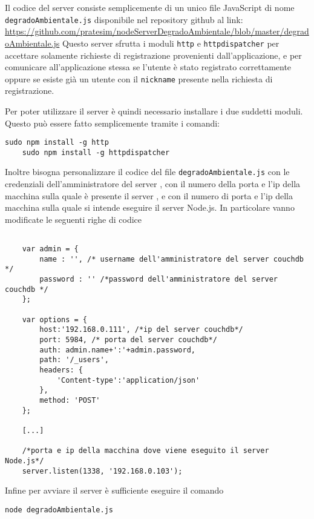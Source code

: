         Il codice del server consiste semplicemente di un unico file
        JavaScript di nome \texttt{degradoAmbientale.js} disponibile nel
        repository github al link:
        \url{https://github.com/pratesim/nodeServerDegradoAmbientale/blob/master/degradoAmbientale.js}
        Questo server sfrutta i moduli \texttt{http} e \texttt{httpdispatcher}
        per accettare solamente richieste di registrazione provenienti
        dall'applicazione, e per comunicare all'applicazione
        stessa se l'utente è stato registrato correttamente oppure se esiste
        già un utente con il \texttt{nickname} presente nella richiesta di
        registrazione.

        Per poter utilizzare il server è quindi necessario installare i due
        suddetti moduli. Questo può essere fatto semplicemente tramite i comandi:
        \begin{lstlisting}[language=plane]
    sudo npm install -g http
    sudo npm install -g httpdispatcher
        \end{lstlisting}

        Inoltre bisogna personalizzare il codice del file
        \texttt{degradoAmbientale.js} con le credenziali dell'amministratore
        del server \couchdb{}, con il numero della porta e l'ip della
        macchina sulla quale è presente il server \couchdb{}, e con il numero
        di porta e l'ip della macchina sulla quale si intende eseguire il
        server Node.js.
        In particolare vanno modificate le seguenti righe di codice
        \begin{lstlisting}[language=plane]

    var admin = {
        name : '', /* username dell'amministratore del server couchdb */
        password : '' /*password dell'amministratore del server couchdb */
    };

    var options = {
        host:'192.168.0.111', /*ip del server couchdb*/
        port: 5984, /* porta del server couchdb*/
        auth: admin.name+':'+admin.password,
        path: '/_users',
        headers: {
            'Content-type':'application/json'
        },
        method: 'POST'
    };

    [...]

    /*porta e ip della macchina dove viene eseguito il server Node.js*/
    server.listen(1338, '192.168.0.103');
        \end{lstlisting}

        Infine per avviare il server è sufficiente eseguire il comando
        \begin{lstlisting}[language=plane]
    node degradoAmbientale.js
        \end{lstlisting}
